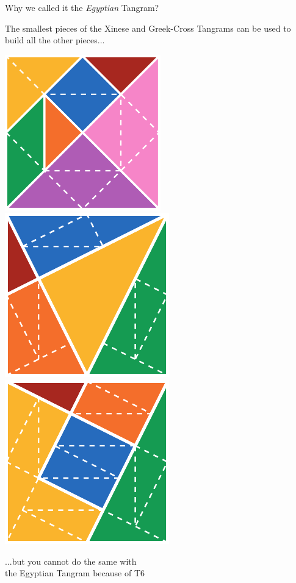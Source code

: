 \documentclass[14pt]{beamer}
\begin{document}

        \begin{frame}{Why we called it the \emph{Egyptian} Tangram?}
        \begin{center}
            The smallest pieces of the Xinese and Greek-Cross Tangrams can be used to build all the other pieces...

            \bigskip \bigskip

            \includegraphics[height=15ex]{figures/figure003c.pdf}\quad\includegraphics[height=15ex]{figures/figure003a.pdf}\quad\includegraphics[height=15ex]{figures/figure003b.pdf} \\

            \bigskip \bigskip

            ...but you cannot do the same with\\the Egyptian Tangram because of T6
        \end{center}
    \end{frame}

\end{document}
